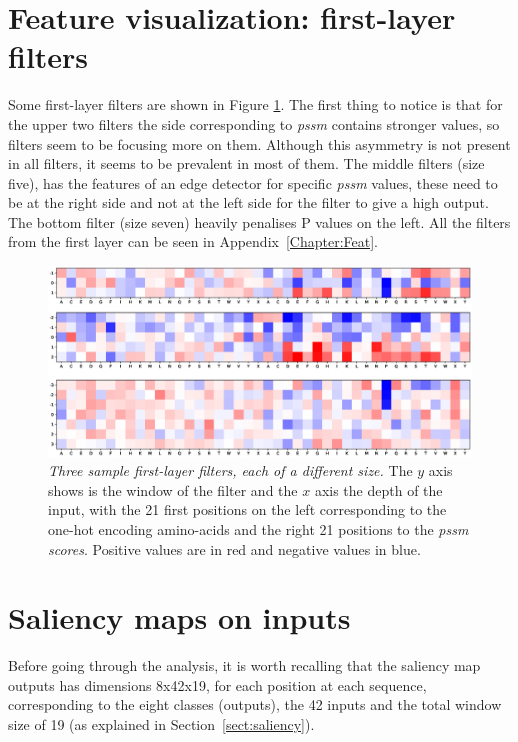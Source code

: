 \section{Feature visualization: first-layer filters}
Some first-layer filters are shown in Figure \ref{fig:filters}. The first thing to notice is that for the upper two filters the side corresponding to \textit{pssm} contains stronger values, so filters seem to be focusing more on them. Although this asymmetry is not present in all filters, it seems to be prevalent in most of them. The middle filters (size five), has the features of an edge detector for specific \textit{pssm} values, these need to be at the right side and not at the left side for the filter to give a high output. The bottom filter (size seven) heavily penalises P values on the left. All the filters from the first layer can be seen in Appendix~\ref{Chapter:Feat}.

\begin{figure}
	\centering
	\includegraphics[width=1\linewidth]{Figures/filters}
	\caption{\textit{Three sample first-layer filters, each of a different size.} The $y$ axis shows is the window of the filter and the $x$ axis the depth of the input, with the 21 first positions on the left corresponding to the one-hot encoding amino-acids and the right 21 positions to the \textit{pssm scores}. Positive values are in red and negative values in blue.}
	\label{fig:filters}
\end{figure}


\section{Saliency maps on inputs}

Before going through the analysis, it is worth recalling that the saliency map outputs has dimensions 8x42x19, for each position at each sequence, corresponding to the eight classes (outputs), the 42 inputs and the total window size of 19 (as explained in Section~\ref{sect:saliency}).

